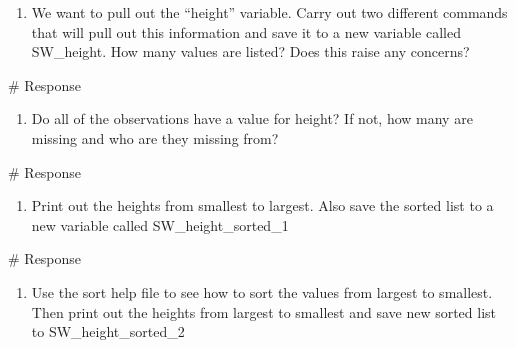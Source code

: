 \documentclass[
  letterpaper,
  DIV=11,
  numbers=noendperiod]{scrreprt}
\newenvironment{Shaded}{\begin{snugshade}}{\end{snugshade}}
\newcommand{\CommentTok}[1]{\textcolor[rgb]{0.37,0.37,0.37}{#1}}
\providecommand{\tightlist}{%
  \setlength{\itemsep}{0pt}\setlength{\parskip}{0pt}}\usepackage{longtable,booktabs,array}
\begin{document}
\begin{enumerate}
\def\labelenumi{\arabic{enumi}.}
\setcounter{enumi}{4}
\tightlist
\item
  We want to pull out the ``height'' variable. Carry out two different
  commands that will pull out this information and save it to a new
  variable called SW\_height. How many values are listed? Does this
  raise any concerns?
\end{enumerate}

\begin{Shaded}
\begin{Highlighting}[]
\CommentTok{\# Response}
\end{Highlighting}
\end{Shaded}

\begin{enumerate}
\def\labelenumi{\arabic{enumi}.}
\setcounter{enumi}{5}
\tightlist
\item
  Do all of the observations have a value for height? If not, how many
  are missing and who are they missing from?
\end{enumerate}

\begin{Shaded}
\begin{Highlighting}[]
\CommentTok{\# Response}
\end{Highlighting}
\end{Shaded}

\begin{enumerate}
\def\labelenumi{\arabic{enumi}.}
\setcounter{enumi}{6}
\tightlist
\item
  Print out the heights from smallest to largest. Also save the sorted
  list to a new variable called SW\_height\_sorted\_1
\end{enumerate}

\begin{Shaded}
\begin{Highlighting}[]
\CommentTok{\# Response}
\end{Highlighting}
\end{Shaded}

\begin{enumerate}
\def\labelenumi{\arabic{enumi}.}
\setcounter{enumi}{7}
\tightlist
\item
  Use the sort help file to see how to sort the values from largest to
  smallest. Then print out the heights from largest to smallest and save
  new sorted list to SW\_height\_sorted\_2
\end{enumerate}
\end{document}
